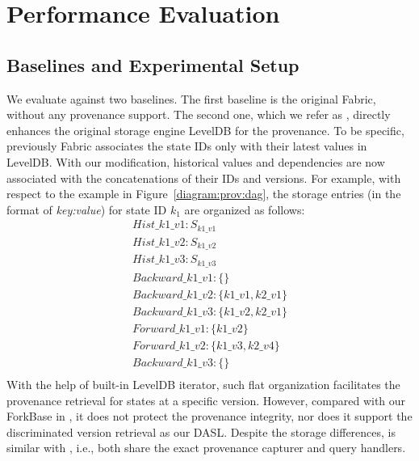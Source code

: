 \section{Performance Evaluation}
\label{sec:provenance:exps}
\subsection{Baselines and Experimental Setup}
\label{sec:provenance:exps:setup}

We evaluate {\fs} against two baselines. 
The first baseline is the original Fabric, without any provenance support.
The second one, which we refer as {\fsPr}, directly enhances the original storage engine LevelDB for the provenance. 
To be specific, previously Fabric associates the state IDs only with their latest values in LevelDB. 
With our modification, historical values and dependencies are now associated with the concatenations of their IDs and versions. 
For example, with respect to the example in Figure~\ref{diagram:prov:dag}, the storage entries (in the format of \textit{key:value}) for state ID $k_1$ are organized as follows: 
\begin{equation*}
  \begin{aligned}
    Hist\_k1\_v1: S_{k1\_v1} \\
    Hist\_k1\_v2: S_{k1\_v2} \\
    Hist\_k1\_v3: S_{k1\_v3} \\
    Backward\_k1\_v1: \{\} \\
    Backward\_k1\_v2: \{k1\_v1,k2\_v1\} \\
    Backward\_k1\_v3: \{k1\_v2,k2\_v1\} \\
    Forward\_k1\_v1: \{k1\_v2\} \\
    Forward\_k1\_v2: \{k1\_v3, k2\_v4\} \\
    Backward\_k1\_v3: \{\} \\
  \end{aligned}
\end{equation*}
With the help of built-in LevelDB iterator, such flat organization facilitates the provenance retrieval for states at a specific version. 
However, compared with our ForkBase in {\fs}, it does not protect the provenance integrity, nor does it support the discriminated version retrieval as our DASL. 
Despite the storage differences, {\fsPr} is similar with {\fs}, i.e., both share the exact provenance capturer and query handlers. 

